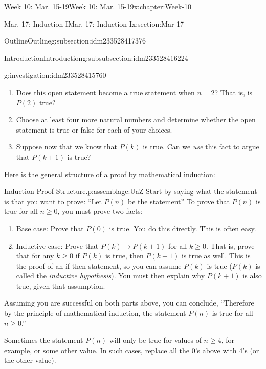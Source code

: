 \documentclass[oneside,10pt,]{book}
\numberwithin{equation}{section}
\renewcommand{\ge}{\geqslant}
\def\imp{\to}
\newcommand{\imp}{\rightarrow}
\begin{document}
\begin{chapterptx}{Week 10: Mar. 15-19}{}{Week 10: Mar. 15-19}{}{}{x:chapter:Week-10}
\begin{sectionptx}{Mar. 17: Induction I}{}{Mar. 17: Induction I}{}{}{x:section:Mar-17}
\begin{subsectionptx}{Outline}{}{Outline}{}{}{g:subsection:idm233528417376}
\begin{subsubsectionptx}{Introduction}{}{Introduction}{}{}{g:subsubsection:idm233528416224}
\begin{investigation}{}{g:investigation:idm233528415760}
\begin{enumerate}
\item{}Does this open statement become a true statement when \(n=2\)? That is, is \(P(2)\) true?%
\item{}Choose at least four more natural numbers and determine whether the open statement is true or false for each of your choices.%
\item{}Suppose now that we know that \(P(k)\) is true. Can we \emph{use} this fact to argue that \(P(k+1)\) is true?%
\end{enumerate}
\end{investigation}%
Here is the general structure of a proof by mathematical induction:%
\begin{assemblage}{Induction Proof Structure.}{p:assemblage:UaZ}%
 Start by saying what the statement is that you want to prove: ``Let \(P(n)\) be the statement\textellipsis{}'' To prove that \(P(n)\) is true for all \(n \ge 0\), you must prove two facts:%
\begin{enumerate}
\item{} Base case: Prove that \(P(0)\) is true. You do this directly. This is often easy.%
\item{} Inductive case: Prove that \(P(k) \imp P(k+1)\) for all \(k \ge 0\). That is, prove that for any \(k \ge 0\) if \(P(k)\) is true, then \(P(k+1)\) is true as well. This is the proof of an if \textellipsis{} then \textellipsis{} statement, so you can assume \(P(k)\) is true (\(P(k)\) is called the \emph{inductive hypothesis}).  You must then explain why \(P(k+1)\) is also true, given that assumption.%
\end{enumerate}
%
\par
Assuming you are successful on both parts above, you can conclude, ``Therefore by the principle of mathematical induction, the statement \(P(n)\) is true for all \(n \ge 0\).''%
\end{assemblage}
Sometimes the statement \(P(n)\) will only be true for values of \(n \ge 4\), for example, or some other value. In such cases, replace all the 0's above with 4's (or the other value).%
\par

\end{subsubsectionptx}
\end{subsectionptx}
\end{sectionptx}
\end{chapterptx}
\end{document}

